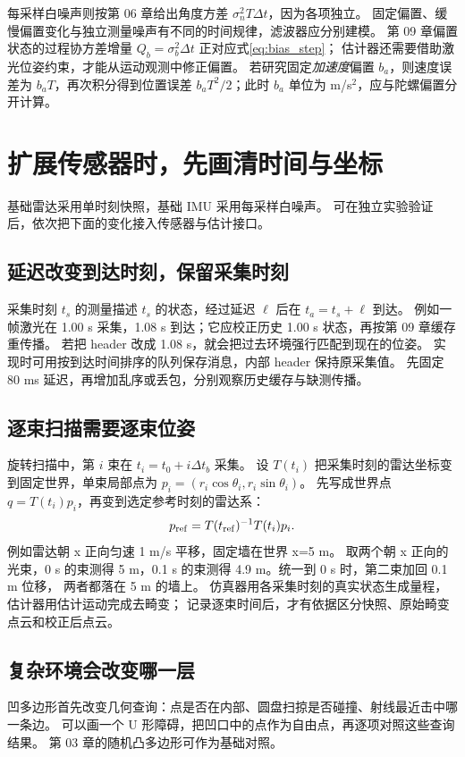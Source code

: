 每采样白噪声则按第 06 章给出角度方差 $\sigma_n^2T\Delta t$，因为各项独立。
固定偏置、缓慢偏置变化与独立测量噪声有不同的时间规律，滤波器应分别建模。
第 09 章偏置状态的过程协方差增量 $Q_b=\sigma_b^2\Delta t$ 正对应式\eqref{eq:bias_step}；
估计器还需要借助激光位姿约束，才能从运动观测中修正偏置。
若研究固定\emph{加速度}偏置 $b_a$，则速度误差为 $b_aT$，再次积分得到位置误差
$b_aT^2/2$；此时 $b_a$ 单位为 m/s$^2$，应与陀螺偏置分开计算。

\section{扩展传感器时，先画清时间与坐标}
基础雷达采用单时刻快照，基础 IMU 采用每采样白噪声。
可在独立实验验证后，依次把下面的变化接入传感器与估计接口。

\subsection{延迟改变到达时刻，保留采集时刻}
采集时刻 $t_s$ 的测量描述 $t_s$ 的状态，经过延迟 $\ell$ 后在 $t_a=t_s+\ell$ 到达。
例如一帧激光在 1.00 s 采集，1.08 s 到达；它应校正历史 1.00 s 状态，再按第 09 章缓存重传播。
若把 header 改成 1.08 s，就会把过去环境强行匹配到现在的位姿。
实现时可用按到达时间排序的队列保存消息，内部 header 保持原采集值。
先固定 80 ms 延迟，再增加乱序或丢包，分别观察历史缓存与缺测传播。

\subsection{逐束扫描需要逐束位姿}
旋转扫描中，第 $i$ 束在 $t_i=t_0+i\Delta t_b$ 采集。
设 $T(t_i)$ 把采集时刻的雷达坐标变到固定世界，单束局部点为
$p_i=(r_i\cos\theta_i,r_i\sin\theta_i)$。
先写成世界点 $q=T(t_i)p_i$，再变到选定参考时刻的雷达系：
\[
 p_{\rm ref}=T(t_{\rm ref})^{-1}T(t_i)p_i.
\]
例如雷达朝 x 正向匀速 1 m/s 平移，固定墙在世界 x=5 m。
取两个朝 x 正向的光束，0 s 的束测得 5 m，0.1 s 的束测得 4.9 m。统一到 0 s 时，第二束加回 0.1 m 位移，
两者都落在 5 m 的墙上。
仿真器用各采集时刻的真实状态生成量程，估计器用估计运动完成去畸变；
记录逐束时间后，才有依据区分快照、原始畸变点云和校正后点云。

\subsection{复杂环境会改变哪一层}
凹多边形首先改变几何查询：点是否在内部、圆盘扫掠是否碰撞、射线最近击中哪一条边。
可以画一个 U 形障碍，把凹口中的点作为自由点，再逐项对照这些查询结果。
第 03 章的随机凸多边形可作为基础对照。

